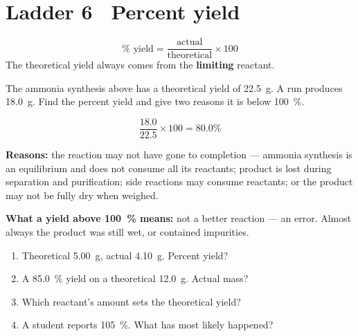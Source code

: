 \documentclass{apchem-worksheet}
\begin{document}
\section*{\sffamily Ladder 6 \textbullet\ Percent yield}

\[ \%\text{ yield} = \frac{\text{actual}}{\text{theoretical}} \times 100 \]
The theoretical yield always comes from the \textbf{limiting} reactant.

\begin{workedexample}
The ammonia synthesis above has a theoretical yield of
\SI{22.5}{\gram}. A run produces \SI{18.0}{\gram}. Find the percent yield
and give two reasons it is below \SI{100}{\percent}.

\[ \frac{18.0}{22.5}\times100 = \mathbf{80.0\%} \]

\textbf{Reasons:} the reaction may not have gone to completion --- ammonia
synthesis is an equilibrium and does not consume all its reactants; product
is lost during separation and purification; side reactions may consume
reactants; or the product may not be fully dry when weighed.

\textbf{What a yield above \SI{100}{\percent} means:} not a better
reaction --- an error. Almost always the product was still wet, or
contained impurities.
\end{workedexample}

\begin{yourturn}
\begin{enumerate}[leftmargin=*,itemsep=0.5em]
  \item Theoretical \SI{5.00}{\gram}, actual \SI{4.10}{\gram}. Percent
        yield? \workspace[1.4cm]
  \item A \SI{85.0}{\percent} yield on a theoretical \SI{12.0}{\gram}.
        Actual mass? \workspace[1.6cm]
  \item Which reactant's amount sets the theoretical yield?
        \workspace[1.4cm]
  \item A student reports \SI{105}{\percent}. What has most likely
        happened? \workspace[1.6cm]
\end{enumerate}
\end{yourturn}
\end{document}
